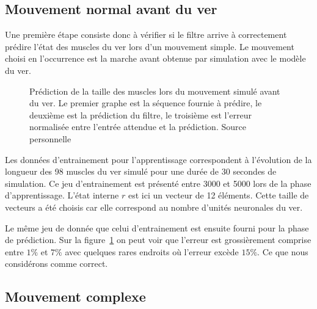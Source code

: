 \subsection{Mouvement normal avant du ver} %
\label{sub:Mouvement normal avant du ver}

Une première étape consiste donc à vérifier si le filtre arrive à correctement
prédire l'état des muscles du ver lors d'un mouvement simple. Le mouvement
choisi en l'occurrence est la marche avant obtenue par simulation avec le
modèle du ver.

\begin{figure}[ht]
   \begin{center}
   \end{center}
   \caption[Prédiction de la taille des muscles lors du mouvement simulé
   avant du ver]{Prédiction de la taille des muscles lors du mouvement simulé
   avant du ver. Le premier graphe est la séquence fournie à prédire, le
   deuxième est la prédiction du filtre, le troisième est l'erreur normalisée
   entre l'entrée attendue et la prédiction. Source personnelle}
   \label{fig:sequence_ver_complet}
\end{figure}

Les données d'entrainement pour l'apprentissage correspondent à l'évolution de
la longueur des 98 muscles du ver simulé pour une durée de 30 secondes de
simulation. Ce jeu d'entrainement est présenté entre 3000 et 5000 lors de la
phase d'apprentissage. L'état interne $r$ est ici un vecteur de 12 éléments.
Cette taille de vecteurs a été choisis car elle correspond au nombre d'unités
neuronales du ver.

Le même jeu de donnée que celui d'entrainement est ensuite fourni pour la phase
de prédiction. Sur la figure~\ref{fig:sequence_ver_complet} on peut voir que l'erreur
est grossièrement comprise entre $1\%$ et $7\%$ avec quelques rares endroits où l'erreur
excède $15\%$. Ce que nous considérons comme correct.


\subsection{Mouvement complexe} %
\label{sub:Mouvement complexe}



